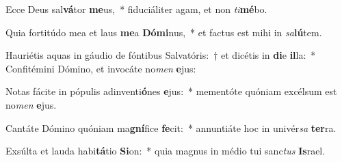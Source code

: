 \item Ecce Deus sal\textbf{vá}tor \textbf{me}us,~* fiduciáliter agam, et non \textit{ti}\textbf{mé}bo.
\item Quia fortitúdo mea et laus \textbf{me}a \textbf{Dó}\textbf{mi}nus,~* et factus est mihi in \textit{sa}\textbf{lú}tem.
\item Hauriétis aquas in gáudio de fóntibus Salvatóris:~† et dicétis in \textbf{di}e \textbf{il}la:~* Confitémini Dómino, et invocáte no\textit{men} \textbf{e}jus:
\item Notas fácite in pópulis adinventi\textbf{ó}nes \textbf{e}jus:~* mementóte quóniam excélsum est no\textit{men} \textbf{e}jus.
\item Cantáte Dómino quóniam ma\textbf{gní}fice \textbf{fe}cit:~* annuntiáte hoc in univér\textit{sa} \textbf{ter}ra.
\item Exsúlta et lauda habi\textbf{tá}tio \textbf{Si}on:~* quia magnus in médio tui sanc\textit{tus} \textbf{Is}rael.
